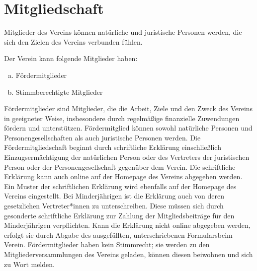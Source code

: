 \section{Mitgliedschaft}
\begin{contract}

    Mitglieder des Vereins können natürliche und juristische Personen werden, die sich den Zielen des Vereins verbunden fühlen.

    Der Verein kann folgende Mitglieder haben:
    \begin{enumerate}[(a)]
        \item Fördermitglieder
        \item Stimmberechtigte Mitglieder
    \end{enumerate}


    Fördermitglieder sind Mitglieder, die die Arbeit, Ziele und den Zweck des Vereins in geeigneter Weise, insbesondere durch regelmäßige finanzielle Zuwendungen fördern und unterstützen. Fördermitglied können sowohl natürliche Personen und Personengesellschaften als auch juristische Personen werden. Die Fördermitgliedschaft beginnt durch schriftliche Erklärung einschließlich Einzugsermächtigung der natürlichen Person oder des Vertreters der juristischen Person oder der Personengesellschaft gegenüber dem Verein. Die schriftliche Erklärung kann auch online auf der Homepage des Vereins abgegeben werden. Ein Muster der schriftlichen Erklärung wird ebenfalls auf der Homepage des Vereins eingestellt. Bei  Minderjährigen ist die Erklärung auch von deren gesetzlichen Vertreter*innen zu unterschreiben. Diese müssen sich durch gesonderte schriftliche Erklärung zur Zahlung der Mitgliedsbeiträge für den Minderjährigen verpflichten. Kann die Erklärung nicht online abgegeben werden, erfolgt sie durch Abgabe des ausgefüllten, unterschriebenen Formularsbeim Verein. Fördermitglieder haben kein Stimmrecht; sie werden zu den Mitgliederversammlungen des Vereins geladen, können diesen beiwohnen und sich zu Wort melden.


\end{contract}
